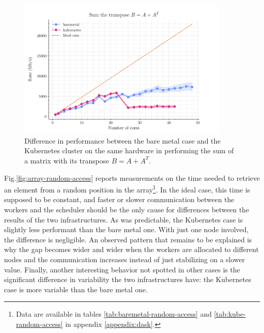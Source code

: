\begin{figure}
  \centering
  \includegraphics[width=0.9\textwidth]{img/chpt4/array-sum-the-transpose}
  \caption{Difference in performance between the bare metal case and the
    Kubernetes cluster on the same hardware in performing the sum of a matrix
    with its transpose $B=A+A^T$.}
  \label{fig:array-sum-transposed-matrix}
\end{figure}

Fig.\ref{fig:array-random-access} reports measurements on the time needed to
retrieve an element from a random position in the array\footnote{
  Data are available in tables \ref{tab:baremetal-random-access} and
  \ref{tab:kube-random-access} in appendix \ref{appendix:dask}.}.
In the ideal case, this time is supposed to be constant, and faster or slower
communication between the workers and the scheduler should be the only cause for
differences between the results of the two infrastructures.
As was predictable, the Kubernetes case is slightly less performant than the
bare metal one. With just one node involved, the difference is negligible. An
observed pattern that remains to be explained is why the gap becomes wider and
wider when the workers are allocated to different nodes and the communication
increases instead of just stabilizing on a slower value.
Finally, another interesting behavior not spotted in other cases is the
significant difference in variability the two infrastructures have: the
Kubernetes case is more variable than the bare metal one.

